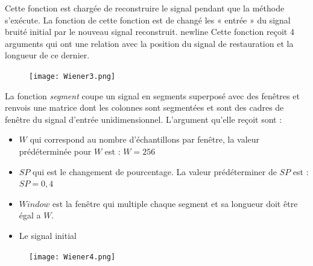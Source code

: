 \documentclass[conference,onecolumn]{IEEEtran}
\begin{document}
 
Cette fonction est chargée de reconstruire le signal pendant que la méthode s’exécute. La fonction de cette fonction est de changé  les « entrée » du signal bruité initial  par le nouveau signal reconstruit. newline  \medskip 
Cette fonction reçoit 4 arguments qui ont une relation avec la position du signal de restauration et la longueur de ce dernier.

\begin{figure}[H]
 \centering
    \texttt{[image: Wiener3.png]}
\end{figure}

La fonction \textit{segment} coupe un signal en segments superposé avec des fenêtres et renvois une matrice dont les colonnes sont segmentées et sont des cadres de fenêtre du signal d’entrée unidimensionnel.
 \medskip
L’argument qu’elle reçoit sont :
\begin{itemize}
    \item $W$ qui correspond au nombre d’échantillons par fenêtre, la valeur prédéterminée pour $W$ est : $W = 256$
   \item $SP $ qui est le changement de pourcentage. La valeur prédéterminer de $SP$ est : $SP = 0,4$
  \item $Window $ est la fenêtre qui multiple chaque segment et sa longueur doit être égal a $W$.
  \item Le signal initial
\end{itemize}
\begin{figure}[H]
 \centering
    \texttt{[image: Wiener4.png]}
\end{figure}
\end{document}
